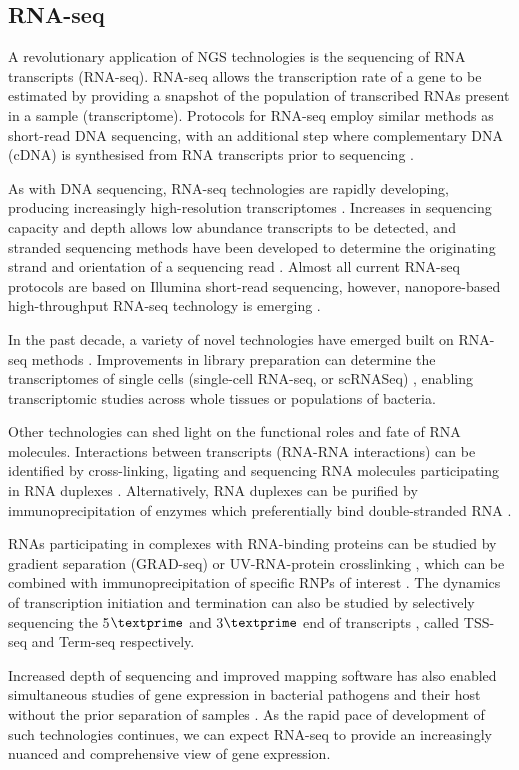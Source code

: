 \subsection{RNA-seq}
A revolutionary application of NGS technologies is the sequencing of RNA transcripts (RNA-seq). RNA-seq allows the transcription rate of a gene to be estimated by providing a snapshot of the population of transcribed RNAs present in a sample (transcriptome). Protocols for RNA-seq employ similar methods as short-read DNA sequencing, with an additional step where complementary DNA (cDNA) is synthesised from RNA transcripts prior to sequencing \citep{Wang2009-ao}.\par
As with DNA sequencing, RNA-seq technologies are rapidly developing, producing increasingly high-resolution transcriptomes \citep{Creecy2015-is}. Increases in sequencing capacity and depth allows low abundance transcripts to be detected, and stranded sequencing methods have been developed to determine the originating strand and orientation of a sequencing read \citep{Parkhomchuk2009-xj,Fullwood2009-wu}. Almost all current RNA-seq protocols are based on Illumina short-read sequencing, however, nanopore-based high-throughput RNA-seq technology is emerging \citep{Workman2018-bo}.\par 
In the past decade, a variety of novel technologies have emerged built on RNA-seq methods \citep{Saliba2017-ax,Hrdlickova2017-ty}. Improvements in library preparation can determine the transcriptomes of single cells (single-cell RNA-seq, or scRNASeq) \citep{Islam2014-rx}, enabling transcriptomic studies across whole tissues or populations of bacteria.\par 
Other technologies can shed light on the functional roles and fate of RNA molecules. Interactions between transcripts (RNA-RNA interactions) can be identified by cross-linking, ligating and sequencing RNA molecules participating in RNA duplexes \citep{Kudla2011-xi}. Alternatively, RNA duplexes can be purified by immunoprecipitation of enzymes which preferentially bind double-stranded RNA \citep{Lioliou2013-if}.\par
RNAs participating in complexes with RNA-binding proteins can be studied by gradient separation (GRAD-seq) \citep{Rederstorff2010-dr,Smirnov2016-yt} or UV-RNA-protein crosslinking \citep{Licatalosi2008-cm}, which can be combined with immunoprecipitation of specific RNPs of interest \citep{Zhao2010-nu,Lu2014-cg,Melamed2016-xv}. The dynamics of transcription initiation and termination can also be studied by selectively sequencing the 5$\textprime$  \citep{Sharma2010-lv} and 3$\textprime$  end of transcripts \citep{Dar2016-vm}, called TSS-seq and Term-seq respectively. \par
Increased depth of sequencing and improved mapping software has also enabled simultaneous studies of gene expression in bacterial pathogens and their host without the prior separation of samples \citep{Westermann2012-pr}. As the rapid pace of development of such technologies continues, we can expect RNA-seq to provide an increasingly nuanced and comprehensive view of gene expression.\par

